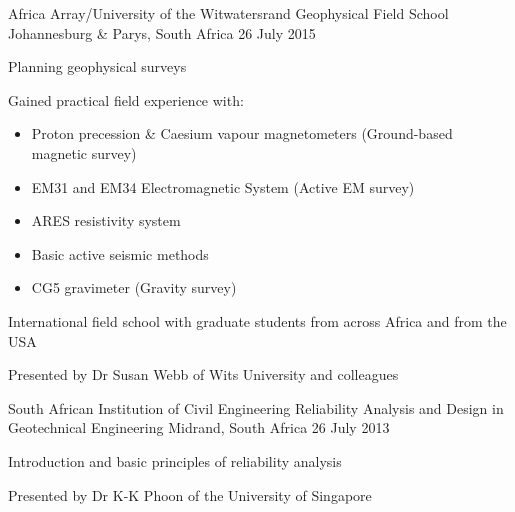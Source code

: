 \begin{cventries}
\cventry
{Africa Array/University of the Witwatersrand} %
{Geophysical Field School} %
{Johannesburg \& Parys, South Africa} %
{26 July 2015} %
{ %
\begin{cvitems}
\item {Planning geophysical surveys}
\item {Gained practical field experience with:
\begin{itemize}
\item {Proton precession \& Caesium vapour magnetometers (Ground-based magnetic survey)}
\item {EM31 and EM34 Electromagnetic System (Active EM survey)}
\item {ARES resistivity system}
\item {Basic active seismic methods}
\item {CG5 gravimeter (Gravity survey)}
\end{itemize}
}
\item {International field school with graduate students from across Africa and from the USA}
\item {Presented by Dr Susan Webb of Wits University and colleagues}
\end{cvitems}
}


\cventry
{South African Institution of Civil Engineering} %
{Reliability Analysis and Design in Geotechnical Engineering} %
{Midrand, South Africa} %
{26 July 2013} %
{ %
\begin{cvitems}
\item {Introduction and basic principles of reliability analysis}
\item {Presented by Dr K-K Phoon of the University of Singapore}
\end{cvitems}
}


\end{cventries}
